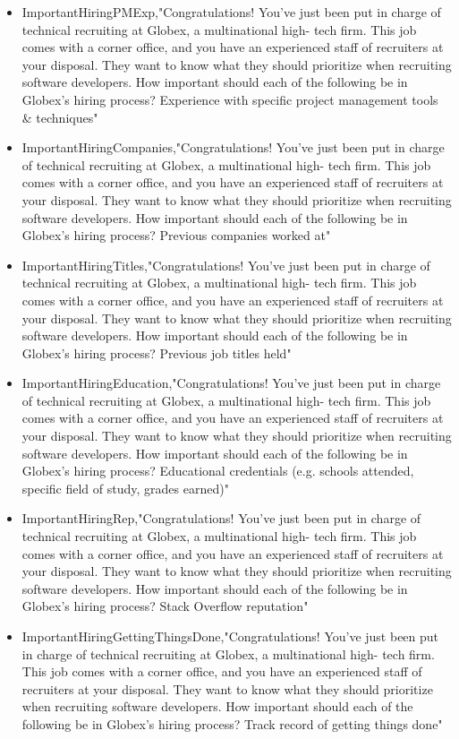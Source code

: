 \begin{appendices}
\begin{itemize}
        \item ImportantHiringPMExp,"Congratulations! You've just been put in charge of technical recruiting at Globex, a multinational high- tech firm. This job comes with a corner office, and you have an experienced staff of recruiters at your disposal. They want to know what they should prioritize when recruiting software developers. How important should each of the following be in Globex's hiring process? Experience with specific project management tools & techniques"
        \item ImportantHiringCompanies,"Congratulations! You've just been put in charge of technical recruiting at Globex, a multinational high- tech firm. This job comes with a corner office, and you have an experienced staff of recruiters at your disposal. They want to know what they should prioritize when recruiting software developers. How important should each of the following be in Globex's hiring process? Previous companies worked at"
        \item ImportantHiringTitles,"Congratulations! You've just been put in charge of technical recruiting at Globex, a multinational high- tech firm. This job comes with a corner office, and you have an experienced staff of recruiters at your disposal. They want to know what they should prioritize when recruiting software developers. How important should each of the following be in Globex's hiring process? Previous job titles held"
        \item ImportantHiringEducation,"Congratulations! You've just been put in charge of technical recruiting at Globex, a multinational high- tech firm. This job comes with a corner office, and you have an experienced staff of recruiters at your disposal. They want to know what they should prioritize when recruiting software developers. How important should each of the following be in Globex's hiring process? Educational credentials (e.g. schools attended, specific field of study, grades earned)"
        \item ImportantHiringRep,"Congratulations! You've just been put in charge of technical recruiting at Globex, a multinational high- tech firm. This job comes with a corner office, and you have an experienced staff of recruiters at your disposal. They want to know what they should prioritize when recruiting software developers. How important should each of the following be in Globex's hiring process? Stack Overflow reputation"
        \item ImportantHiringGettingThingsDone,"Congratulations! You've just been put in charge of technical recruiting at Globex, a multinational high- tech firm. This job comes with a corner office, and you have an experienced staff of recruiters at your disposal. They want to know what they should prioritize when recruiting software developers. How important should each of the following be in Globex's hiring process? Track record of getting things done"

\end{itemize}
\end{appendices}
